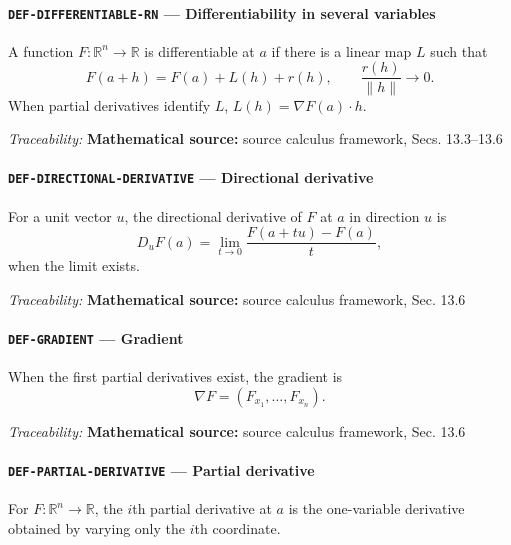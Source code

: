 \documentclass[10pt]{article}
\newcommand{\pidraw}[1]{\begingroup\urlstyle{tt}\nolinkurl{#1}\endgroup}
\theoremstyle{definition}
\theoremstyle{remark}
\begin{document}
\paragraph{\pidraw{DEF-DIFFERENTIABLE-RN} --- Differentiability in several variables}

A function $F:\mathbb{R}^n\to\mathbb{R}$ is differentiable at $a$ if there is a linear map $L$ such that
\[
F(a+h)=F(a)+L(h)+r(h),\qquad \frac{r(h)}{\|h\|}\to0.
\]
When partial derivatives identify $L$, $L(h)=\nabla F(a)\cdot h$.

\smallskip\noindent\textit{Traceability:} \textbf{Mathematical source:} source calculus framework, Secs. 13.3--13.6\par

\label{prf:DEF-DIRECTIONAL-DERIVATIVE}

\paragraph{\pidraw{DEF-DIRECTIONAL-DERIVATIVE} --- Directional derivative}

For a unit vector $u$, the directional derivative of $F$ at $a$ in direction $u$ is
\[
D_uF(a)=\lim_{t\to0}\frac{F(a+tu)-F(a)}{t},
\]
when the limit exists.

\smallskip\noindent\textit{Traceability:} \textbf{Mathematical source:} source calculus framework, Sec. 13.6\par

\label{prf:DEF-GRADIENT}

\paragraph{\pidraw{DEF-GRADIENT} --- Gradient}

When the first partial derivatives exist, the gradient is
 \[
 \nabla F=(F_{x_1},\ldots,F_{x_n}).
 \]

\smallskip\noindent\textit{Traceability:} \textbf{Mathematical source:} source calculus framework, Sec. 13.6\par

\label{prf:DEF-PARTIAL-DERIVATIVE}

\paragraph{\pidraw{DEF-PARTIAL-DERIVATIVE} --- Partial derivative}

For $F:\mathbb{R}^n\to\mathbb{R}$, the $i$th partial derivative at $a$ is the one-variable derivative obtained by varying only the $i$th coordinate.
\end{document}
